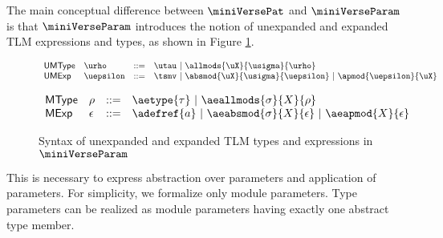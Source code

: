 \documentclass[acmsmall,10pt,review,anonymous]{acmart}\settopmatter{printfolios=true}
\begin{document}
The main conceptual difference between $\miniVersePat$ and $\miniVerseParam$ is that $\miniVerseParam$ introduces the notion of unexpanded and expanded TLM expressions and types, as shown in Figure \ref{fig:P-macro-expressions-types}. 

\begin{figure}[h]
\begin{minipage}{0.36\textwidth}
$\begin{array}{llcl}
\mathsf{UMType} & \urho & ::= & \utau ~\vert~ \allmods{\uX}{\usigma}{\urho}\\
\mathsf{UMExp} & \uepsilon & ::= & \tsmv ~\vert~ \absmod{\uX}{\usigma}{\uepsilon}~\vert~ \apmod{\uepsilon}{\uX}
\end{array}$
\end{minipage}
\begin{minipage}{0.6\textwidth}
$\begin{array}{llcl}
\mathsf{MType} & \rho & ::= & \aetype{\tau} ~\vert~ \aeallmods{\sigma}{X}{\rho} \\
\mathsf{MExp} & \epsilon & ::= & \adefref{a} ~\vert~ \aeabsmod{\sigma}{X}{\epsilon} ~\vert~\aeapmod{X}{\epsilon} 
\end{array}$
\end{minipage}
\vspace{-6px}
\caption{Syntax of unexpanded and expanded TLM types and expressions in $\miniVerseParam$}
\label{fig:P-macro-expressions-types}
\vspace{-6px}
\end{figure}
This is necessary to express abstraction over parameters and application of parameters. For simplicity, we formalize only module parameters. Type parameters can be realized as module parameters having exactly one abstract type member.
\end{document}
